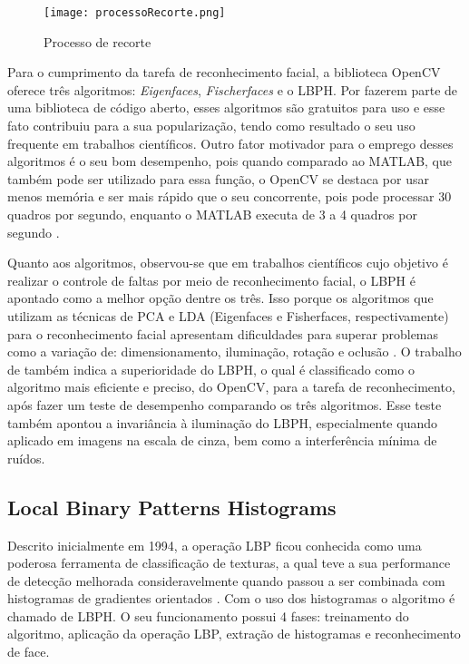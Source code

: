 \begin{figure}[!ht]
	\centering
	\texttt{[image: processoRecorte.png]}   
	\caption{Processo de recorte}
	\label{fig:figura25}
\end{figure}

Para o cumprimento da tarefa de reconhecimento facial, a biblioteca OpenCV  oferece três algoritmos: \textit{Eigenfaces}, \textit{Fischerfaces} e o LBPH. Por fazerem parte de uma biblioteca de código aberto, esses algoritmos são gratuitos para uso e esse fato contribuiu para a sua popularização, tendo como resultado o seu uso frequente em trabalhos científicos. Outro fator motivador para o emprego desses algoritmos é o seu bom desempenho, pois quando comparado ao MATLAB, que também pode ser utilizado para essa função, o OpenCV se destaca por usar menos memória e ser mais rápido que o seu concorrente, pois pode processar 30 quadros por segundo, enquanto o MATLAB executa de 3 a 4 quadros por segundo \citep{Kriti2018}. 

Quanto aos algoritmos, observou-se que em trabalhos científicos cujo objetivo é realizar o controle de faltas por meio de reconhecimento facial, o LBPH é apontado como a melhor opção dentre os três. Isso porque os algoritmos que utilizam as técnicas de PCA e LDA (Eigenfaces e Fisherfaces, respectivamente) para o reconhecimento facial apresentam dificuldades para superar problemas como a variação de: dimensionamento, iluminação, rotação e oclusão \citep{varun2018}. O trabalho de \citep{Kriti2018} também indica a superioridade do LBPH, o qual é classificado como o algoritmo mais eficiente e preciso, do OpenCV, para a tarefa de reconhecimento, após fazer um teste de desempenho comparando os três algoritmos. Esse teste também apontou a invariância à iluminação do LBPH, especialmente quando aplicado em imagens na escala de cinza, bem como a interferência mínima de ruídos. 



\subsection{Local Binary Patterns Histograms}
Descrito inicialmente em 1994, a operação LBP ficou conhecida como uma poderosa ferramenta de classificação de texturas, a qual teve a sua performance de detecção melhorada consideravelmente quando passou a ser combinada com histogramas de gradientes orientados \citep{tdc2018}. Com o uso dos histogramas o algoritmo é chamado de LBPH. O seu funcionamento possui 4 fases: treinamento do algoritmo, aplicação da operação LBP, extração de histogramas e reconhecimento de face.

